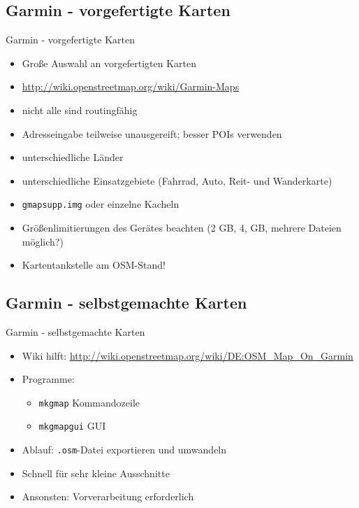\documentclass{beamer}
\begin{document}
\subsection{Garmin - vorgefertigte Karten}
\begin{frame}
Garmin - vorgefertigte Karten
\begin{itemize}
  \item Große Auswahl an vorgefertigten Karten
  \item \url{http://wiki.openstreetmap.org/wiki/Garmin-Maps}
  \item nicht alle sind routingfähig
  \item Adresseingabe teilweise unausgereift; besser POIs verwenden
  \item unterschiedliche Länder
  \item unterschiedliche Einsatzgebiete (Fahrrad, Auto, Reit- und
    Wanderkarte)
  \item \texttt{gmapsupp.img} oder einzelne Kacheln
  \item Größenlimitierungen des Gerätes beachten (2 GB, 4, GB, mehrere
    Dateien möglich?)
  \item Kartentankstelle am OSM-Stand!
\end{itemize}
\end{frame}

\subsection{Garmin - selbstgemachte Karten}
\begin{frame}
  Garmin - selbstgemachte Karten
  \begin{itemize}
    \item Wiki hilft:
      \url{http://wiki.openstreetmap.org/wiki/DE:OSM_Map_On_Garmin}
    \item Programme:
    \begin{itemize}
      \item \texttt{mkgmap} Kommandozeile
      \item \texttt{mkgmapgui} GUI
    \end{itemize}
    \item Ablauf: \texttt{.osm}-Datei exportieren und umwandeln
    \item Schnell für sehr kleine Ausschnitte
    \item Ansonsten: Vorverarbeitung erforderlich
  \end{itemize}
\end{frame}
\end{document}
